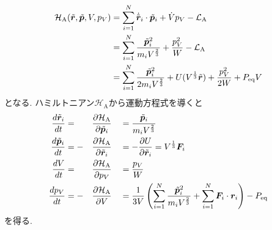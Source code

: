 \begin{align}
 \mathcal{H}_{\mathrm{A}}
 (\Tilde{\bm{r}}, \Tilde{\bm{p}}, V, p_{V})
 &=
 \sum_{i=1}^{N} \dot{\Tilde{\bm{r}}}_{i} \cdot \Tilde{\bm{p}}_{i}
 + \dot{V} p_{V} - \mathcal{L}_{\mathrm{A}}
 \notag
 \\
 &=
 \sum_{i=1}^{N} \frac{\Tilde{\bm{p}}_{i}^{2}}{m_{i} V^{\frac{2}{3}}}
 + \frac{p_{V}^2}{W} - \mathcal{L}_{\mathrm{A}}
 \notag
 \\
 &=
 \sum_{i=1}^{N} \frac{\Tilde{\bm{p}}_{i}^{2}}{2 m_{i} V^{\frac{2}{3}}}
 + U(V^{\frac{1}{3}} \Tilde{\bm{r}})
 + \frac{p_{V}^2}{2W} + P_{\mathrm{eq}}V
 \label{eq:Andersen6}
\end{align}
となる. ハミルトニアン$\mathcal{H}_{\mathrm{A}}$から運動方程式を導くと
\begin{alignat}{3}
 \frac{d \Tilde{\bm{r}}_{i}}{d t}
  &= &&\frac{\partial \mathcal{H}_{\mathrm{A}}}{\partial \Tilde{\bm{p}}_{i}} &
  &= \frac{\Tilde{\bm{p}}_{i}}{m_{i} V^{\frac{2}{3}}}
 \label{eq:Andersen7.1}
 \\
 \frac{d \Tilde{\bm{p}}_{i}}{d t}
  &= - &&\frac{\partial \mathcal{H}_{\mathrm{A}}}{\partial \Tilde{\bm{r}}_{i}}&
  &= - \frac{\partial U}{\partial \Tilde{\bm{r}}_{i}}
   =   V^{\frac{1}{3}} \bm{F}_{i}
 \label{eq:Andersen7.2}
 \\
 \frac{d V}{d t}
  &= &&\frac{\partial \mathcal{H}_{\mathrm{A}}}{\partial p_{V}} &
 &= \frac{p_{V}}{W}
 \label{eq:Andersen7.3}
 \\
 \frac{d p_{V}}{d t}
  &= - &&\frac{\partial \mathcal{H}_{\mathrm{A}}}{\partial V}  &
  &= \frac{1}{3V}
   \left(
         \sum_{i=1}^{N} \frac{\Tilde{\bm{p}}^{2}_{i}}{m_{i} V^{\frac{2}{3}}}
       + \sum_{i=1}^{N} \bm{F}_{i} \cdot \bm{r}_{i}
   \right)
   - P_{\mathrm{eq}}
 \label{eq:Andersen7.4}
\end{alignat}
を得る. 

